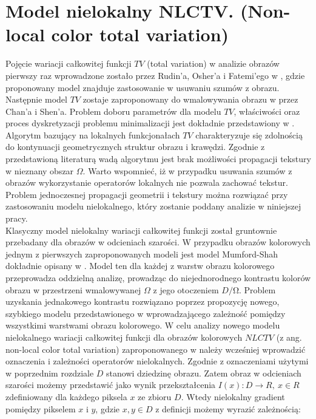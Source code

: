 \documentclass[12pt, twoside, openany]{report}
\theoremstyle{definition}
\begin{document}
\section{Model nielokalny NLCTV. (Non-local color total variation)}
\label{sec:sNLCTV}
Pojęcie wariacji całkowitej funkcji $TV$ (total variation) w analizie obrazów pierwszy raz wprowadzone zostało przez Rudin'a, Osher'a i Fatemi’ego w \cite{rudin1992nonlinear}, gdzie proponowany model znajduje zastosowanie w usuwaniu szumów z obrazu. Następnie model $TV$ zostaje zaproponowany do wmalowywania obrazu w \cite{MathematicalModelsforNLTextureInpainting} przez Chan'a i Shen’a. Problem doboru parametrów dla modelu $TV$, właściwości oraz proces dyskretyzacji problemu minimalizacji jest dokładnie przedstawiony w \cite{getreuer2012total}. Algorytm bazujący na lokalnych funkcjonałach $TV$  charakteryzuje się zdolnością do kontynuacji geometrycznych struktur obrazu i krawędzi. Zgodnie z przedstawioną literaturą wadą algorytmu jest brak możliwości propagacji tekstury w nieznany obszar $\Omega$. Warto wspomnieć, iż w przypadku usuwania szumów z obrazów wykorzystanie operatorów lokalnych nie pozwala zachować tekstur. Problem jednoczesnej propagacji geometrii i tekstury można rozwiązać przy zastosowaniu modelu nielokalnego, który zostanie poddany analizie w niniejszej pracy. \\
Klasyczny model nielokalny wariacji całkowitej funkcji został gruntownie przebadany dla obrazów w odcieniach szarości. W przypadku obrazów kolorowych jednym z pierwszych zaproponowanych modeli jest model Mumford-Shah dokładnie opisany w \cite{jung2011nonlocal}. Model ten dla każdej z warstw obrazu kolorowego przeprowadza oddzielną analizę, prowadząc do niejednorodnego kontrastu kolorów obrazu w przestrzeni wmalowywanej $\Omega$ z jego otoczeniem $D/\mathrm{\Omega}$. Problem uzyskania jednakowego kontrastu rozwiązano poprzez propozycję nowego, szybkiego modelu przedstawionego w \cite{duan2015fast} wprowadzającego zależność pomiędzy wszystkimi warstwami obrazu kolorowego. W celu analizy nowego modelu nielokalnego wariacji całkowitej funkcji dla obrazów kolorowych $NLCTV$ (z ang. non-local color total variation) zaproponowanego w \cite{duan2015fast} należy wcześniej wprowadzić oznaczenia i zależności operatorów nielokalnych. 
Zgodnie z oznaczeniami użytymi w poprzednim rozdziale $D$ stanowi dziedzinę obrazu. Zatem obraz w odcieniach szarości możemy przedstawić jako wynik przekształcenia $I\left(x\right):D\longrightarrow R,\ x\in R$ zdefiniowany dla każdego piksela $x$ ze zbioru $D$. Wtedy nielokalny gradient pomiędzy pikselem $x$ i $y$, gdzie $x,y\in D$ z definicji możemy wyrazić zależnością:
\end{document}
